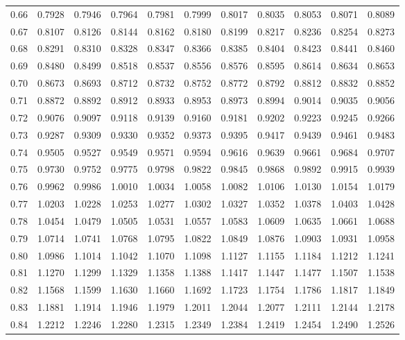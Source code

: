 \begin{center}
\begin{tabular}{r*{10}{r}}
		0.66 & 0.7928 & 0.7946 & 0.7964 & 0.7981 & 0.7999 & 0.8017 & 0.8035 & 0.8053 & 0.8071 & 0.8089 \\
		0.67 & 0.8107 & 0.8126 & 0.8144 & 0.8162 & 0.8180 & 0.8199 & 0.8217 & 0.8236 & 0.8254 & 0.8273 \\
		0.68 & 0.8291 & 0.8310 & 0.8328 & 0.8347 & 0.8366 & 0.8385 & 0.8404 & 0.8423 & 0.8441 & 0.8460 \\
		0.69 & 0.8480 & 0.8499 & 0.8518 & 0.8537 & 0.8556 & 0.8576 & 0.8595 & 0.8614 & 0.8634 & 0.8653 \\[5pt]
		0.70 & 0.8673 & 0.8693 & 0.8712 & 0.8732 & 0.8752 & 0.8772 & 0.8792 & 0.8812 & 0.8832 & 0.8852 \\
		0.71 & 0.8872 & 0.8892 & 0.8912 & 0.8933 & 0.8953 & 0.8973 & 0.8994 & 0.9014 & 0.9035 & 0.9056 \\
		0.72 & 0.9076 & 0.9097 & 0.9118 & 0.9139 & 0.9160 & 0.9181 & 0.9202 & 0.9223 & 0.9245 & 0.9266 \\
		0.73 & 0.9287 & 0.9309 & 0.9330 & 0.9352 & 0.9373 & 0.9395 & 0.9417 & 0.9439 & 0.9461 & 0.9483 \\
		0.74 & 0.9505 & 0.9527 & 0.9549 & 0.9571 & 0.9594 & 0.9616 & 0.9639 & 0.9661 & 0.9684 & 0.9707 \\
		0.75 & 0.9730 & 0.9752 & 0.9775 & 0.9798 & 0.9822 & 0.9845 & 0.9868 & 0.9892 & 0.9915 & 0.9939 \\
		0.76 & 0.9962 & 0.9986 & 1.0010 & 1.0034 & 1.0058 & 1.0082 & 1.0106 & 1.0130 & 1.0154 & 1.0179 \\
		0.77 & 1.0203 & 1.0228 & 1.0253 & 1.0277 & 1.0302 & 1.0327 & 1.0352 & 1.0378 & 1.0403 & 1.0428 \\
		0.78 & 1.0454 & 1.0479 & 1.0505 & 1.0531 & 1.0557 & 1.0583 & 1.0609 & 1.0635 & 1.0661 & 1.0688 \\
		0.79 & 1.0714 & 1.0741 & 1.0768 & 1.0795 & 1.0822 & 1.0849 & 1.0876 & 1.0903 & 1.0931 & 1.0958 \\[5pt]
		0.80 & 1.0986 & 1.1014 & 1.1042 & 1.1070 & 1.1098 & 1.1127 & 1.1155 & 1.1184 & 1.1212 & 1.1241 \\
		0.81 & 1.1270 & 1.1299 & 1.1329 & 1.1358 & 1.1388 & 1.1417 & 1.1447 & 1.1477 & 1.1507 & 1.1538 \\
		0.82 & 1.1568 & 1.1599 & 1.1630 & 1.1660 & 1.1692 & 1.1723 & 1.1754 & 1.1786 & 1.1817 & 1.1849 \\
		0.83 & 1.1881 & 1.1914 & 1.1946 & 1.1979 & 1.2011 & 1.2044 & 1.2077 & 1.2111 & 1.2144 & 1.2178 \\
		0.84 & 1.2212 & 1.2246 & 1.2280 & 1.2315 & 1.2349 & 1.2384 & 1.2419 & 1.2454 & 1.2490 & 1.2526 \\

\end{tabular}
\end{center}
